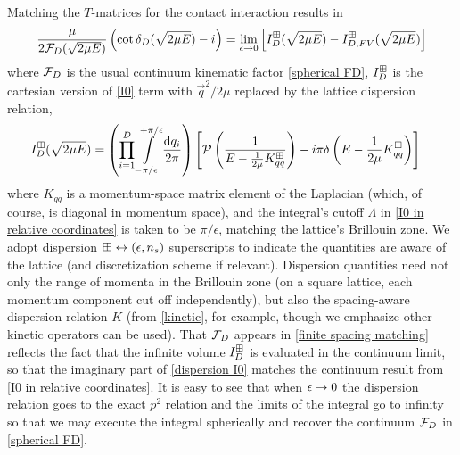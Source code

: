 Matching the $T$-matrices for the contact interaction results in 
\begin{equation}
    \label{eq:finite spacing matching}
    \frac{\mu}{2 \mathcal{F}_D(\sqrt{2\mu E})}\left(\cot\delta_D(\sqrt{2\mu E})-i\right)
    =
    \lim_{\epsilon\rightarrow0}
    \left[
    	I_D^{\boxplus}(\sqrt{2\mu E}) - I_{D,FV}^{\boxplus}(\sqrt{2\mu E})
	\right]
\end{equation}
where $\mathcal{F}_D$ is the usual continuum kinematic factor \eqref{spherical FD}, $I_D^{\boxplus}$ is the cartesian version of \eqref{I0} term with $\vec{q}^2/2\mu$ replaced by the lattice dispersion relation,
\begin{align}
	\label{eq:dispersion I0}
    I_D^{\boxplus}(\sqrt{2 \mu E})
    &=
    \left(\prod_{i=1}^D
    \int\limits_{-\pi/\epsilon}^{+\pi/\epsilon}
    \frac{\mathrm{d} q_i}{2\pi}
    \right)
        \left[
            \mathcal{P} \left(
                \frac{1}{
                    E - \frac{1}{2\mu} K_{qq}^\boxplus }
                \right)
            -i \pi \delta\left(E - \frac{1}{2\mu}K_{qq}^\boxplus\right)
        \right]
\end{align}
where $K_{qq}$ is a momentum-space matrix element of the Laplacian (which, of course, is diagonal in momentum space), and the integral's cutoff $\Lambda$ in \eqref{I0 in relative coordinates} is taken to be $\pi/\epsilon$, matching the lattice's Brillouin zone.
We adopt dispersion $\boxplus \leftrightarrow (\epsilon, {n_s})$ superscripts to indicate the quantities are aware of the lattice (and discretization scheme if relevant).
Dispersion quantities need not only the range of momenta in the Brillouin zone (on a square lattice, each momentum component cut off independently), but also the spacing-aware dispersion relation $K$ (from \eqref{kinetic}, for example, though we emphasize other kinetic operators can be used).
That $\mathcal{F}_D$ appears in \eqref{finite spacing matching} reflects the fact that the infinite volume $I_D^{\boxplus}$ is evaluated in the continuum limit, so that the imaginary part of \eqref{dispersion I0} matches the continuum result from \eqref{I0 in relative coordinates}.
It is easy to see that when $\epsilon\rightarrow0$ the dispersion relation goes to the exact $p^2$ relation and the limits of the integral go to infinity so that we may execute the integral spherically and recover the continuum $\mathcal{F}_D$ in \eqref{spherical FD}.


